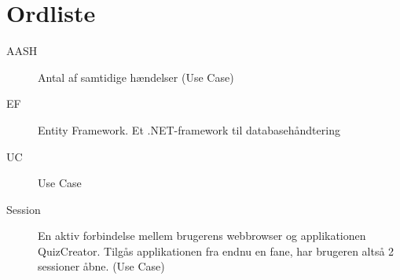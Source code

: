 \chapter{Ordliste}\label{head:ordliste}




\begin{description}
\item[AASH] Antal af samtidige hændelser (Use Case)
\item[EF] Entity Framework. Et .NET-framework til databasehåndtering
\item[UC] Use Case
\item[Session] En aktiv forbindelse mellem brugerens webbrowser og applikationen QuizCreator. Tilgås applikationen fra endnu en fane, har brugeren altså 2 sessioner åbne. (Use Case)

\end{description}